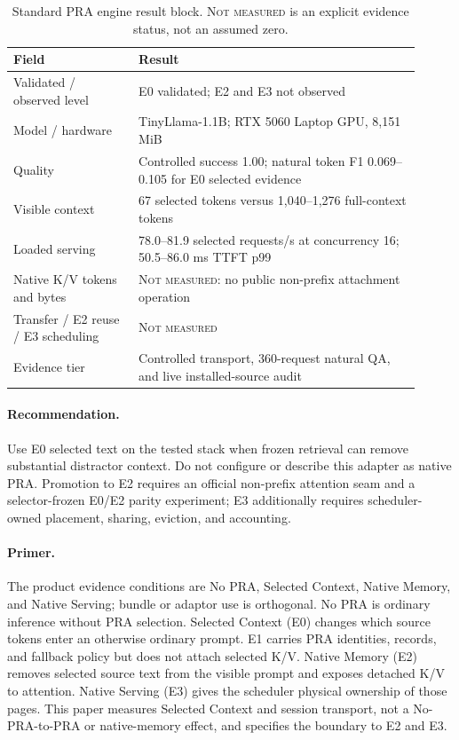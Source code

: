 \documentclass[10pt]{article}
\begin{document}
\begin{table}[ht]
\centering
\small
\caption{Standard PRA engine result block. \textsc{Not measured} is an
explicit evidence status, not an assumed zero.}
\label{tab:qualification-snapshot}
\begin{tabular}{p{0.28\linewidth}p{0.63\linewidth}}
\toprule
Field & Result \\
\midrule
Validated / observed level & E0 validated; E2 and E3 not observed \\
Model / hardware & TinyLlama-1.1B; RTX 5060 Laptop GPU, 8,151 MiB \\
Quality & Controlled success 1.00; natural token F1 0.069--0.105 for E0 selected evidence \\
Visible context & 67 selected tokens versus 1,040--1,276 full-context tokens \\
Loaded serving & 78.0--81.9 selected requests/s at concurrency 16; 50.5--86.0 ms TTFT p99 \\
Native K/V tokens and bytes & \textsc{Not measured}: no public non-prefix attachment operation \\
Transfer / E2 reuse / E3 scheduling & \textsc{Not measured} \\
Evidence tier & Controlled transport, 360-request natural QA, and live installed-source audit \\
\bottomrule
\end{tabular}
\end{table}

\paragraph{Recommendation.}
Use E0 selected text on the tested stack when frozen retrieval can remove
substantial distractor context. Do not configure or describe this adapter as
native PRA. Promotion to E2 requires an official non-prefix attention seam and
a selector-frozen E0/E2 parity experiment; E3 additionally requires
scheduler-owned placement, sharing, eviction, and accounting.

\paragraph{Primer.}
The product evidence conditions are No PRA, Selected Context, Native Memory,
and Native Serving; bundle or adaptor use is orthogonal. No PRA is ordinary
inference without PRA selection. Selected Context (E0) changes which source
tokens enter an otherwise ordinary prompt. E1 carries PRA identities, records,
and fallback policy but does not attach selected K/V. Native Memory (E2)
removes selected source text from the visible prompt and exposes detached K/V
to attention. Native Serving (E3) gives the scheduler physical ownership of
those pages. This paper measures Selected Context and session transport, not a
No-PRA-to-PRA or native-memory effect, and specifies the boundary to E2 and E3.
\end{document}
